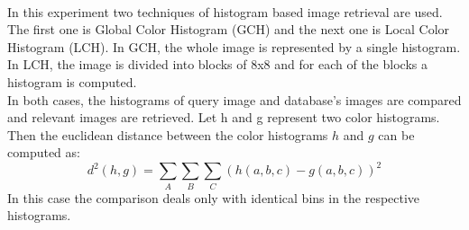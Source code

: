 \documentclass[pstricks,10pt]{report}
\begin{document}
\\
In this experiment two techniques of histogram based image retrieval are used. The first one is Global Color Histogram (GCH) and the next one is Local Color Histogram (LCH). In GCH, the whole image is represented by a single histogram. In LCH, the image is divided into blocks of 8x8 and for each of the blocks a histogram is computed.\\
In both cases, the histograms of query image and database’s images are compared and relevant images are retrieved. Let h and g represent two color histograms. Then the euclidean distance between the color histograms $h$ and $g$ can be computed as: 
\begin{equation}
d^2(h,g)=\sum_A\sum_B\sum_C(h(a,b,c)-g(a,b,c))^2\label{eq:7}
\end{equation}
In this case the comparison deals only with identical bins in the respective histograms.
\end{document}
